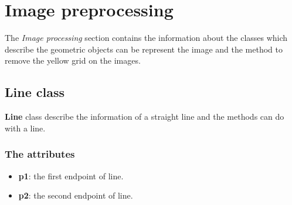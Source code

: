 \section{Image preprocessing}
The \textit{Image processing} section contains the information about the classes which describe the geometric objects can be represent the image and the method to remove the yellow grid on the images.
\subsection{Line class}
\textbf{Line} class describe the information of a straight line and the methods can do with a line.
\subsubsection{The attributes}
\begin{itemize}
\item\textbf{p1}: the first endpoint of line.
\item\textbf{p2}: the second endpoint of line.
\end{itemize}
